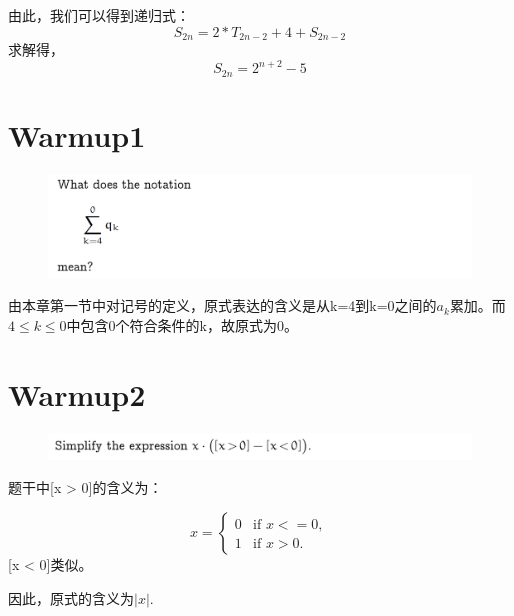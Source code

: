 \documentclass[]{article}
\begin{document}
\begin{enumerate}
\begin{figure}[H]
\end{figure}
由此，我们可以得到递归式：
\begin{equation}
	S_{2n} = 2 * T_{2n-2} + 4 + S_{2n-2}
\end{equation}
求解得，
\begin{equation}
	S_{2n} = 2^{n+2}-5
\end{equation}

\end{enumerate}


\section*{Warmup1}
\begin{figure}[htb]
	\includegraphics[scale=1]{W1}
\end{figure}

由本章第一节中对记号的定义，原式表达的含义是从k=4到k=0之间的$a_{k}$累加。而$4 \le k \le 0$中包含0个符合条件的k，故原式为0。


\section*{Warmup2}
\begin{figure}[htb]
	\includegraphics[scale=1]{W2}
\end{figure}


题干中[x > 0]的含义为：\par 
\begin{equation}
	x = \left\{ \begin{array}{rl} 0 & 
		\text{if } x <= 0,\\ 1 & \text{if } x > 0. \end{array} \right.
\end{equation}
[x < 0]类似。\par 
因此，原式的含义为$|x|$.\par 
\end{document}
